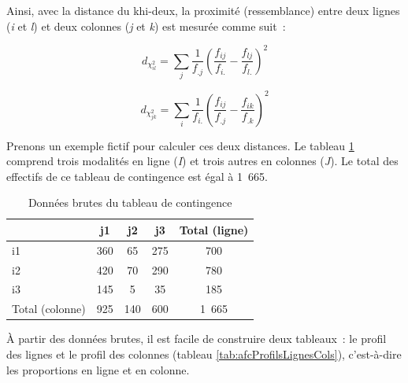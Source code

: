 \documentclass[
  11pt,
  french,
]{book}
\begin{document}
Ainsi, avec la distance du khi-deux, la proximité (ressemblance) entre deux lignes (\emph{i} et \emph{l}) et deux colonnes (\emph{j} et \emph{k}) est mesurée comme suit~:

\footnotesize

\begin{equation}
d_{\chi_{il}^2} = \sum_j \frac{1}{f_{.j}}(\frac{f_{ij}}{f_{i.}}-\frac{f_{lj}}{f_{l.}})^2
\label{eq:khideuxlignes}
\end{equation}
\normalsize

\footnotesize

\begin{equation}
d_{\chi_{jk}^2} = \sum_i \frac{1}{f_{i.}}(\frac{f_{ij}}{f_{.j}}-\frac{f_{ik}}{f_{.k}})^2
\label{eq:khideuxcolonnes}
\end{equation}
\normalsize

Prenons un exemple fictif pour calculer ces deux distances. Le tableau \ref{tab:afcdataex1} comprend trois modalités en ligne (\emph{I}) et trois autres en colonnes (\emph{J}). Le total des effectifs de ce tableau de contingence est égal à 1~665.

\begin{table}

\caption{\label{tab:afcdataex1}Données brutes du tableau de contingence}
\centering
\fontsize{8}{10}\selectfont
\begin{tabular}[t]{lcccc}
\toprule
  & j1 & j2 & j3 & Total (ligne)\\
\midrule
i1 & 360 & 65 & 275 & 700\\
i2 & 420 & 70 & 290 & 780\\
i3 & 145 & 5 & 35 & 185\\
Total (colonne) & 925 & 140 & 600 & 1 665\\
\bottomrule
\end{tabular}
\end{table}

À partir des données brutes, il est facile de construire deux tableaux~: le profil des lignes et le profil des colonnes (tableau \ref{tab:afcProfilsLignesCols}), c'est-à-dire les proportions en ligne et en colonne.
\end{document}
